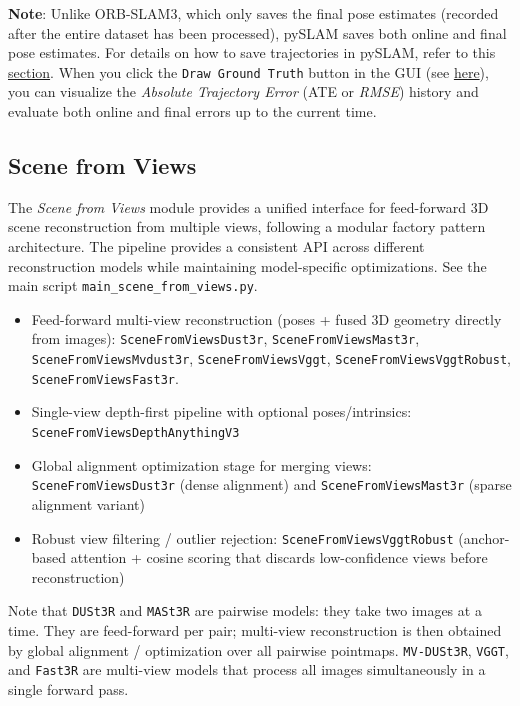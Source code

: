 \documentclass{article}
\providecommand{\tightlist}{%
  \setlength{\itemsep}{0pt}\setlength{\parskip}{0pt}}
\begin{document}
\textbf{Note}: Unlike ORB-SLAM3, which only saves the final pose
estimates (recorded after the entire dataset has been processed), pySLAM
saves both online and final pose estimates. For details on how to save
trajectories in pySLAM, refer to this
\protect\hyperlink{trajectory-saving}{section}. When you click the
\texttt{Draw\ Ground\ Truth} button in the GUI (see
\protect\hyperlink{slam-gui}{here}), you can visualize the
\emph{Absolute Trajectory Error} (ATE or \emph{RMSE}) history and
evaluate both online and final errors up to the current time.



\hypertarget{scene-from-views-usage}{%
\subsection{Scene from Views}\label{scene-from-views-usage}}

The \textit{Scene from Views} module provides a unified interface for feed-forward 3D scene reconstruction from multiple
views, following a modular factory pattern architecture. The pipeline
provides a consistent API across different reconstruction models while
maintaining model-specific optimizations. See the main script
\texttt{main\_scene\_from\_views.py}.

\begin{itemize}
\tightlist
\item
  Feed-forward multi-view reconstruction (poses + fused 3D geometry
  directly from images): \texttt{SceneFromViewsDust3r},
  \texttt{SceneFromViewsMast3r}, \texttt{SceneFromViewsMvdust3r},
  \texttt{SceneFromViewsVggt}, \texttt{SceneFromViewsVggtRobust}, \texttt{SceneFromViewsFast3r}.
\item
  Single-view depth-first pipeline with optional poses/intrinsics:
  \texttt{SceneFromViewsDepthAnythingV3}
\item
  Global alignment optimization stage for merging views:
  \texttt{SceneFromViewsDust3r} (dense alignment) and
  \texttt{SceneFromViewsMast3r} (sparse alignment variant)
\item
  Robust view filtering / outlier rejection:
  \texttt{SceneFromViewsVggtRobust} (anchor-based attention + cosine
  scoring that discards low-confidence views before reconstruction)
\end{itemize}

Note that \texttt{DUSt3R} and \texttt{MASt3R} are pairwise models: they
take two images at a time. They are feed-forward per pair; multi-view
reconstruction is then obtained by global alignment / optimization over
all pairwise pointmaps. \texttt{MV-DUSt3R}, \texttt{VGGT}, and
\texttt{Fast3R} are multi-view models that process all images
simultaneously in a single forward pass.
\end{document}
